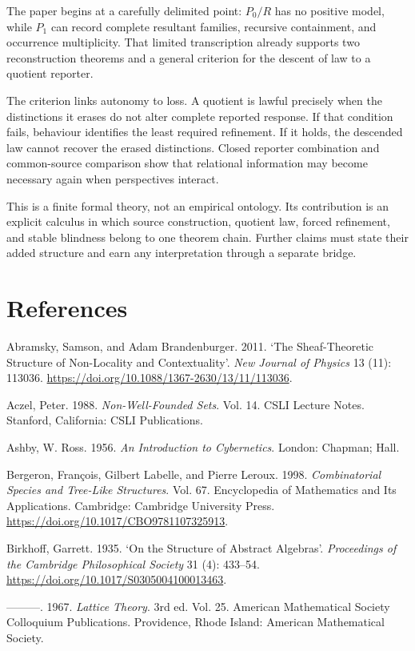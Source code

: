 \documentclass[11pt,a4paper]{article}
\begin{document}
The paper begins at a carefully delimited point: \(P_{0}/R\) has no
positive model, while \(P_{1}\) can record complete resultant families,
recursive containment, and occurrence multiplicity. That limited
transcription already supports two reconstruction theorems and a general
criterion for the descent of law to a quotient reporter.

The criterion links autonomy to loss. A quotient is lawful precisely
when the distinctions it erases do not alter complete reported response.
If that condition fails, behaviour identifies the least required
refinement. If it holds, the descended law cannot recover the erased
distinctions. Closed reporter combination and common-source comparison
show that relational information may become necessary again when
perspectives interact.

This is a finite formal theory, not an empirical ontology. Its
contribution is an explicit calculus in which source construction,
quotient law, forced refinement, and stable blindness belong to one
theorem chain. Further claims must state their added structure and earn
any interpretation through a separate bridge.

\section{References}

Abramsky, Samson, and Adam Brandenburger. 2011. `The Sheaf-Theoretic
Structure of Non-Locality and Contextuality'. \emph{New Journal of
Physics} 13 (11): 113036.
\url{https://doi.org/10.1088/1367-2630/13/11/113036}.

Aczel, Peter. 1988. \emph{Non-Well-Founded Sets}. Vol. 14. CSLI Lecture
Notes. Stanford, California: CSLI Publications.

Ashby, W. Ross. 1956. \emph{An Introduction to Cybernetics}. London:
Chapman; Hall.

Bergeron, François, Gilbert Labelle, and Pierre Leroux. 1998.
\emph{Combinatorial Species and Tree-Like Structures}. Vol. 67.
Encyclopedia of Mathematics and Its Applications. Cambridge: Cambridge
University Press. \url{https://doi.org/10.1017/CBO9781107325913}.

Birkhoff, Garrett. 1935. `On the Structure of Abstract Algebras'.
\emph{Proceedings of the Cambridge Philosophical Society} 31 (4):
433--54. \url{https://doi.org/10.1017/S0305004100013463}.

---------. 1967. \emph{Lattice Theory}. 3rd ed. Vol. 25. American
Mathematical Society Colloquium Publications. Providence, Rhode Island:
American Mathematical Society.
\end{document}
